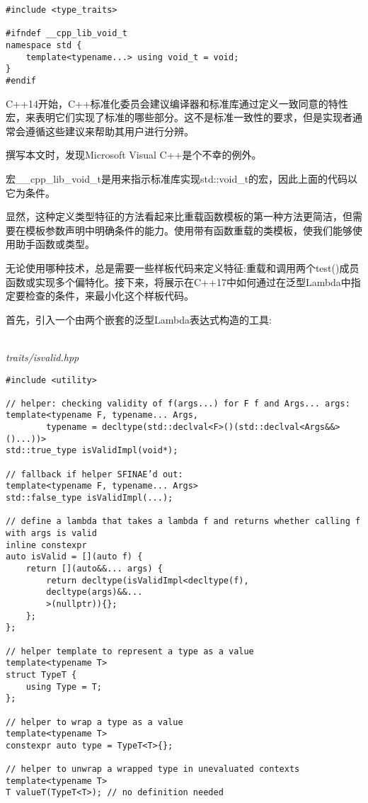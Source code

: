 \begin{lstlisting}[style=styleCXX]
#include <type_traits>

#ifndef __cpp_lib_void_t
namespace std {
	template<typename...> using void_t = void;
}
#endif
\end{lstlisting}

C++14开始，C++标准化委员会建议编译器和标准库通过定义一致同意的特性宏，来表明它们实现了标准的哪些部分。这不是标准一致性的要求，但是实现者通常会遵循这些建议来帮助其用户进行分辨。

\begin{tcolorbox}[colback=webgreen!5!white,colframe=webgreen!75!black]
\hspace*{0.75cm}撰写本文时，发现Microsoft Visual C++是个不幸的例外。
\end{tcolorbox}

宏\_\_cpp\_lib\_void\_t是用来指示标准库实现std::void\_t的宏，因此上面的代码以它为条件。

显然，这种定义类型特征的方法看起来比重载函数模板的第一种方法更简洁，但需要在模板参数声明中明确条件的能力。使用带有函数重载的类模板，使我们能够使用助手函数或类型。


无论使用哪种技术，总是需要一些样板代码来定义特征:重载和调用两个test()成员函数或实现多个偏特化。接下来，将展示在C++17中如何通过在泛型Lambda中指定要检查的条件，来最小化这个样板代码。

首先，引入一个由两个嵌套的泛型Lambda表达式构造的工具:

\hspace*{\fill} \\ %
\noindent
\textit{traits/isvalid.hpp}
\begin{lstlisting}[style=styleCXX]
#include <utility>

// helper: checking validity of f(args...) for F f and Args... args:
template<typename F, typename... Args,
		typename = decltype(std::declval<F>()(std::declval<Args&&>()...))>
std::true_type isValidImpl(void*);

// fallback if helper SFINAE’d out:
template<typename F, typename... Args>
std::false_type isValidImpl(...);

// define a lambda that takes a lambda f and returns whether calling f with args is valid
inline constexpr
auto isValid = [](auto f) {
	return [](auto&&... args) {
		return decltype(isValidImpl<decltype(f),
		decltype(args)&&...
		>(nullptr)){};
	};
};

// helper template to represent a type as a value
template<typename T>
struct TypeT {
	using Type = T;
};

// helper to wrap a type as a value
template<typename T>
constexpr auto type = TypeT<T>{};

// helper to unwrap a wrapped type in unevaluated contexts
template<typename T>
T valueT(TypeT<T>); // no definition needed
\end{lstlisting}

